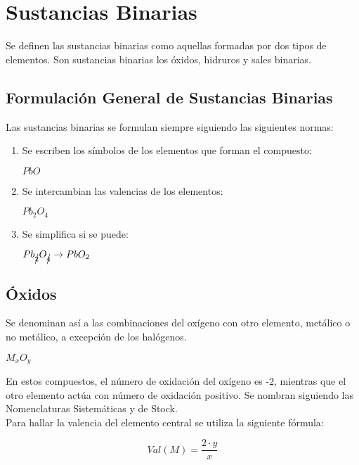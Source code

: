 \documentclass[11pt,fleqn]{book} %
\begin{document}
\section{Sustancias Binarias}
	Se definen las sustancias binarias como aquellas formadas por dos tipos de elementos. Son sustancias binarias los óxidos, hidruros y sales binarias.

\subsection{Formulación General de Sustancias Binarias}
	Las sustancias binarias se formulan siempre siguiendo las siguientes normas:\\
\begin{enumerate}
	\item Se escriben los símbolos de los elementos que forman el compuesto:\\
\begin{center}
		$PbO$
\end{center}
		\item Se intercambian las valencias de los elementos:\\
\begin{center}
	$Pb_{2}O_4$
\end{center}
		\item Se simplifica si se puede:\\
\begin{center}
	$Pb_{\cancel{2}}O_{\cancel{4}} \rightarrow PbO_2$
\end{center}
\end{enumerate}
\subsection {Óxidos}
Se denominan así a las combinaciones del oxígeno con otro elemento, metálico o no metálico, a excepción de los halógenos.\\

\begin{center}
	$M_{x}O_y$
\end{center}

En estos compuestos, el número de oxidación del oxígeno es -2, mientras que el otro elemento actúa con número de oxidación positivo. Se nombran siguiendo las Nomenclaturas Sistemáticas y de Stock.\\ 

Para hallar la valencia del elemento central se utiliza la siguiente fórmula:

\begin{equation}
	Val(M)= \frac{2\cdot y}{x}
\end{equation}
\end{document}
